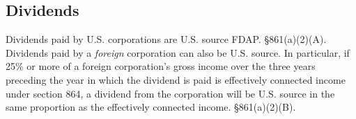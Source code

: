 
 
 
	\subsection{Dividends}

Dividends paid by U.S. corporations are U.S. source FDAP.  \S 861(a)(2)(A).   Dividends paid by a \emph{foreign} corporation can also be U.S. source.  In particular, if 25\% or more of a foreign corporation's gross income over the three years preceding the year in which the dividend is paid is effectively connected income under section 864, a dividend from the corporation will be U.S. source in the same proportion as the effectively connected income.  \S 861(a)(2)(B).   


